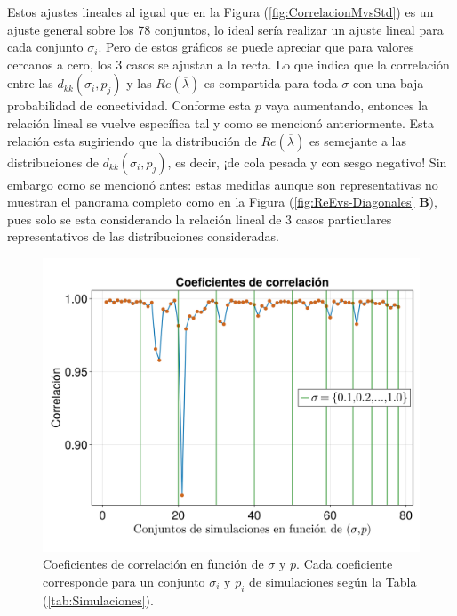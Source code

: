 Estos ajustes lineales al igual que en la Figura (\ref{fig:CorrelacionMvsStd}) es un ajuste general sobre los 78 conjuntos, lo ideal sería realizar un ajuste lineal para cada conjunto $\sigma_i$. Pero de estos gráficos se puede apreciar que para valores cercanos a cero, los 3 casos se ajustan a la recta. Lo que indica que la correlación entre las $d_{kk}(\sigma_i,p_j)$ y las $Re(\overline{\lambda})$ es compartida para toda $\sigma$ con una baja probabilidad de conectividad. Conforme esta $p$ vaya aumentando, entonces la relación lineal se vuelve específica tal y como se mencionó anteriormente. Esta relación esta sugiriendo que la distribución de $Re(\overline{\lambda})$ es semejante a las distribuciones de $d_{kk}(\sigma_i,p_j)$, es decir, ¡de cola pesada y con sesgo negativo! Sin embargo como se mencionó antes: estas medidas aunque son representativas no muestran el panorama completo como en la Figura (\ref{fig:ReEvs-Diagonales} \textbf{B}), pues solo se esta considerando la relación lineal de 3 casos particulares representativos de las distribuciones consideradas. 
\begin{figure}[h!]
	\centering
	\includegraphics[scale=0.2]{../Imagenes/CoeficientesCorrelacion}
	\caption{Coeficientes de correlación en función de $\sigma$ y $p$. Cada coeficiente corresponde para un conjunto $\sigma_i$ y $p_i$ de simulaciones según la Tabla (\ref{tab:Simulaciones}).}
	\label{fig:CoeficientesCorrelacion}
\end{figure}

